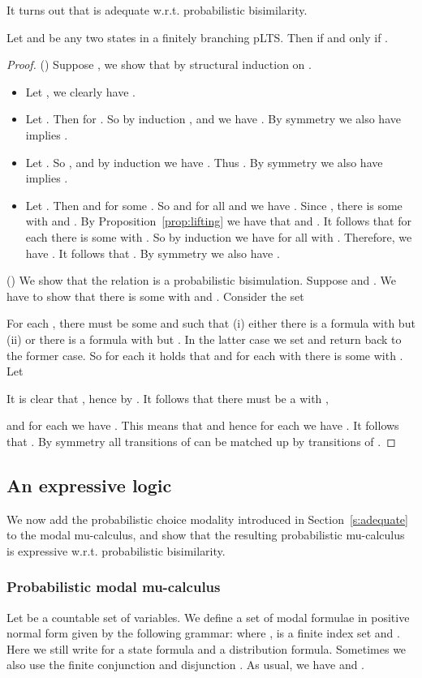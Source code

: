 \documentclass{article}
\begin{document}
It turns out that  is adequate w.r.t. probabilistic
bisimilarity.
\begin{theorem}[Adequacy]\label{p:modal.characterisation}
Let  and  be any two states in a finitely branching pLTS. Then
 if and only if .
\end{theorem}
\begin{proof}
()
 Suppose , we show that  by structural induction on .
\begin{itemize}
\item Let , we clearly have .
\item Let . Then 
  for . So by induction , and we have
  . By symmetry we also have
   implies .
\item Let . So , and by induction
  we have . Thus . By symmetry we
  also have  implies .
\item Let . Then  and 
  for some . So
   and for all  and
   we have . Since , there is some  with 
  and . By
  Proposition~\ref{prop:lifting}  we have that  and . It follows
  that for each  there is some
   with .
  So by induction we have  for all  with .
  Therefore, we have . It follows that .
  By symmetry we also have
  .
\end{itemize}

() We show that the relation  is a probabilistic
bisimulation. Suppose  and . We have to
show that there is some  with  and . Consider the set

 For each , there must be some
  and
  such that (i) either there is a formula  with
 but
 (ii) or there is a formula
 with  but
. In the latter case we set
 and return back to the former
case. So for each  it holds that
 and for each  with 
there is some  with
. Let

It is clear that , hence  by .
It follows that there must be a  with
,

and for each  we have
. This means that  and hence
for each  we
have . It follows that . By symmetry all transitions of  can be matched up
by transitions of .
\end{proof}

\subsection{An expressive logic}
We now add the probabilistic choice modality introduced in
Section~\ref{s:adequate} to the modal mu-calculus, and show that the
resulting probabilistic mu-calculus is expressive w.r.t.
probabilistic bisimilarity.
\subsubsection{Probabilistic modal mu-calculus} Let  be a
countable set of variables.
We define a  set  of modal formulae in positive normal form
given by the following grammar:
  where
,  is a finite index set and . Here
we still write  for a state formula and  a distribution
formula. Sometimes we also use the finite conjunction
 and disjunction .
As usual, we have  and
.
\end{document}
